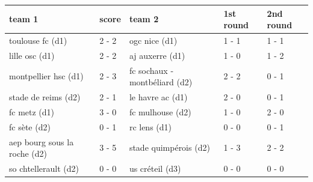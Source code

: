 \documentclass{article}
\begin{document}
\begin{tabular}{lllll}
\toprule
team 1 & score & team 2 & 1st round & 2nd round \\
\midrule
toulouse fc (d1) & 2 - 2 & ogc nice (d1) & 1 - 1 & 1 - 1 \\
lille osc (d1) & 2 - 2 & aj auxerre (d1) & 1 - 0 & 1 - 2 \\
montpellier hsc (d1) & 2 - 3 & fc sochaux - montbéliard (d2) & 2 - 2 & 0 - 1 \\
stade de reims (d2) & 2 - 1 & le havre ac (d1) & 2 - 0 & 0 - 1 \\
fc metz (d1) & 3 - 0 & fc mulhouse (d2) & 1 - 0 & 2 - 0 \\
fc sète (d2) & 0 - 1 & rc lens (d1) & 0 - 0 & 0 - 1 \\
aep bourg sous la roche (d2) & 3 - 5 & stade quimpérois (d2) & 1 - 3 & 2 - 2 \\
so chtellerault (d2) & 0 - 0 & us créteil (d3) & 0 - 0 & 0 - 0 \\
\bottomrule
\end{tabular}
\end{document}
